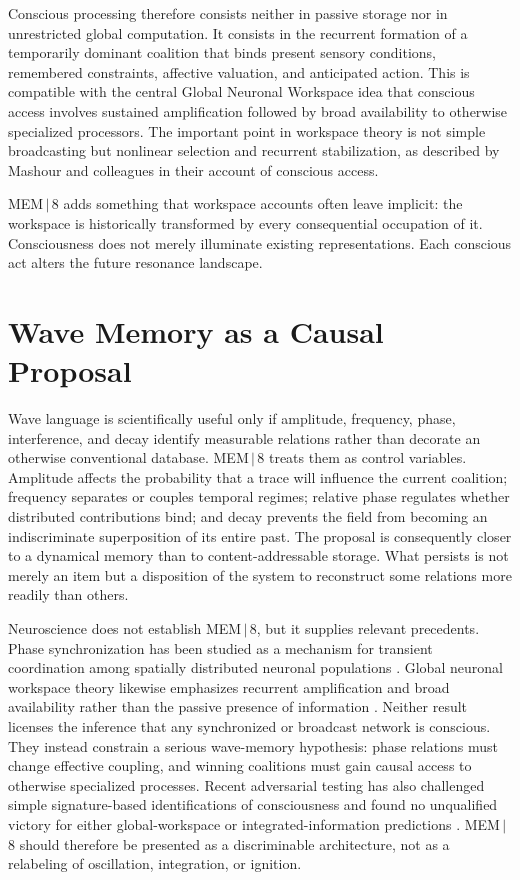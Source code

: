 \documentclass[11pt]{article}
\begin{document}
Conscious processing therefore consists neither in passive storage nor in unrestricted global computation. It consists in the recurrent formation of a temporarily dominant coalition that binds present sensory conditions, remembered constraints, affective valuation, and anticipated action. This is compatible with the central Global Neuronal Workspace idea that conscious access involves sustained amplification followed by broad availability to otherwise specialized processors. The important point in workspace theory is not simple broadcasting but nonlinear selection and recurrent stabilization, as described by Mashour and colleagues in their account of conscious access.

MEM\,$|$\,8 adds something that workspace accounts often leave implicit: the workspace is historically transformed by every consequential occupation of it. Consciousness does not merely illuminate existing representations. Each conscious act alters the future resonance landscape.

\section{Wave Memory as a Causal Proposal}

Wave language is scientifically useful only if amplitude, frequency, phase, interference, and decay identify measurable relations rather than decorate an otherwise conventional database. MEM\,$|$\,8 treats them as control variables. Amplitude affects the probability that a trace will influence the current coalition; frequency separates or couples temporal regimes; relative phase regulates whether distributed contributions bind; and decay prevents the field from becoming an indiscriminate superposition of its entire past. The proposal is consequently closer to a dynamical memory than to content-addressable storage. What persists is not merely an item but a disposition of the system to reconstruct some relations more readily than others.

Neuroscience does not establish MEM\,$|$\,8, but it supplies relevant precedents. Phase synchronization has been studied as a mechanism for transient coordination among spatially distributed neuronal populations \cite{varela2001,palva2005}. Global neuronal workspace theory likewise emphasizes recurrent amplification and broad availability rather than the passive presence of information \cite{dehaene2011,mashour2020}. Neither result licenses the inference that any synchronized or broadcast network is conscious. They instead constrain a serious wave-memory hypothesis: phase relations must change effective coupling, and winning coalitions must gain causal access to otherwise specialized processes. Recent adversarial testing has also challenged simple signature-based identifications of consciousness and found no unqualified victory for either global-workspace or integrated-information predictions \cite{ferrante2025}. MEM\,$|$\,8 should therefore be presented as a discriminable architecture, not as a relabeling of oscillation, integration, or ignition.
\end{document}
